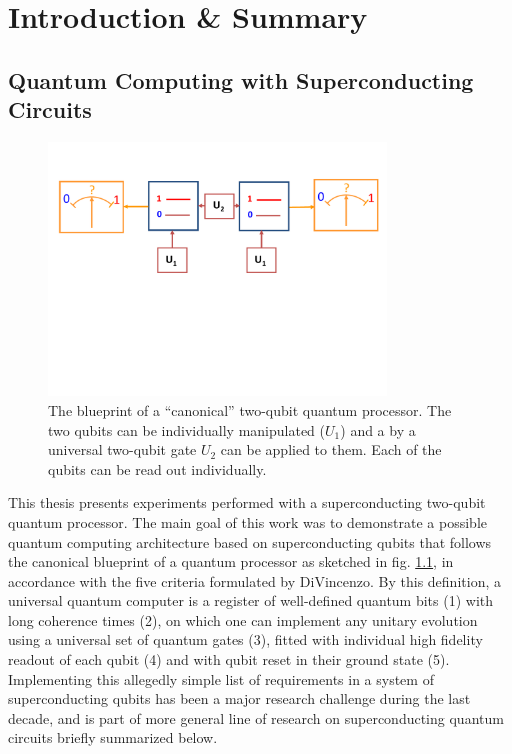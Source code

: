 \chapter{Introduction \& Summary}




\section{Quantum Computing with Superconducting Circuits}

%
\begin{figure}
\centering \includegraphics[width=0.8\textwidth]{./material/papers/grover/submission1/Fig1}
\caption[Blueprint of a {}``canonical'' two-qubit quantum processor]{The blueprint of a {}``canonical'' two-qubit quantum processor.
The two qubits can be individually manipulated ($U_{1}$) and a by
a universal two-qubit gate $U_{2}$ can be applied to them. Each of
the qubits can be read out individually.}


\label{fig:qubit_processor_blueprint} %
\end{figure}


This thesis presents experiments performed with a superconducting
two-qubit quantum processor. The main goal of this work was to demonstrate
a possible quantum computing architecture based on superconducting
qubits that follows the canonical blueprint of a quantum processor
as sketched in fig. \ref{fig:qubit_processor_blueprint},
in accordance with the five criteria formulated by DiVincenzo\citep{divincenzo_physical_2000}.
By this definition, a universal quantum computer is a register of
well-defined quantum bits (1) with long coherence times (2),
on which one can implement any unitary evolution using a universal
set of quantum gates (3), fitted with individual high fidelity readout
of each qubit (4) and with qubit reset in their ground state (5). Implementing this allegedly simple list of requirements
in a system of superconducting qubits has been a major research challenge
during the last decade, and is part of more general line of research
on superconducting quantum circuits briefly summarized below.


